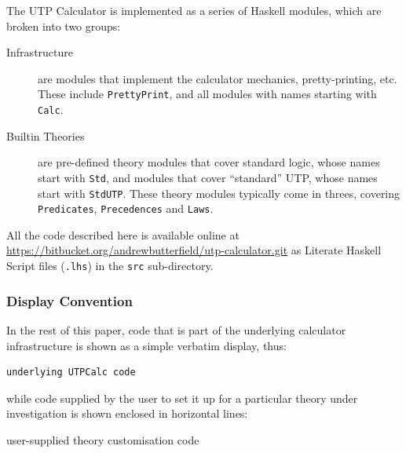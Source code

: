 The UTP Calculator is implemented as a series
of Haskell modules,
which are broken into two groups:
\begin{description}
  \item[Infrastructure]
    are modules that implement the calculator mechanics,
    pretty-printing, etc.
    These include \texttt{PrettyPrint},
    and all modules with names starting with \texttt{Calc}.
  \item[Builtin Theories]
    are pre-defined theory modules that cover standard logic,
    whose names start with \texttt{Std}, and modules that cover ``standard''
    UTP, whose names start with \texttt{StdUTP}.
    These theory modules typically come in threes, covering
    \texttt{Predicates}, \texttt{Precedences} and \texttt{Laws}.
\end{description}
All the code described here is available online
at
\\\url{https://bitbucket.org/andrewbutterfield/utp-calculator.git}
as Literate Haskell Script files (\texttt{.lhs})
in the \texttt{src} sub-directory.

\subsubsection{Display Convention}

In the rest of this paper, code that is part of the underlying
calculator infrastructure is shown as a simple verbatim display, thus:
\begin{verbatim}
underlying UTPCalc code
\end{verbatim}
while code supplied by the user to set it up for a particular
theory under investigation is shown enclosed in horizontal lines:
\begin{code}
user-supplied theory customisation code
\end{code}
